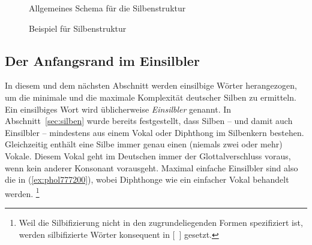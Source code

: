 
\begin{figure}
  \centering
  \caption{Allgemeines Schema für die Silbenstruktur}
  \label{fig:silbenstruktur}
\end{figure}

\newcommand{\ThePhonStr}{  
}

\begin{figure}
  \centering
  \ThePhonStr
  \caption{Beispiel für Silbenstruktur}
  \label{fig:phonstr}
\end{figure}


\subsection{Der Anfangsrand im Einsilbler}

\label{sec:anfangsrandimeinsilbler}

In diesem und dem nächsten Abschnitt werden einsilbige Wörter herangezogen, um die minimale und die maximale Komplexität deutscher Silben zu ermitteln.
Ein einsilbiges Wort wird üblicherweise \textit{Einsilbler} genannt.
In Abschnitt~\ref{sec:silben} wurde bereits festgestellt, dass Silben -- und damit auch Einsilbler -- mindestens aus einem Vokal oder Diphthong im Silbenkern bestehen.
Gleichzeitig enthält eine Silbe immer genau einen (niemals zwei oder mehr) Vokale.
Diesem Vokal geht im Deutschen immer der Glottalverschluss voraus, wenn kein anderer Konsonant vorausgeht.
Maximal einfache Einsilbler sind also die in (\ref{ex:phol777200}), wobei Diphthonge wie ein einfacher Vokal behandelt werden.%
\footnote{Weil die Silbifizierung nicht in den zugrundeliegenden Formen spezifiziert ist, werden silbifizierte Wörter konsequent in [~] gesetzt.}


